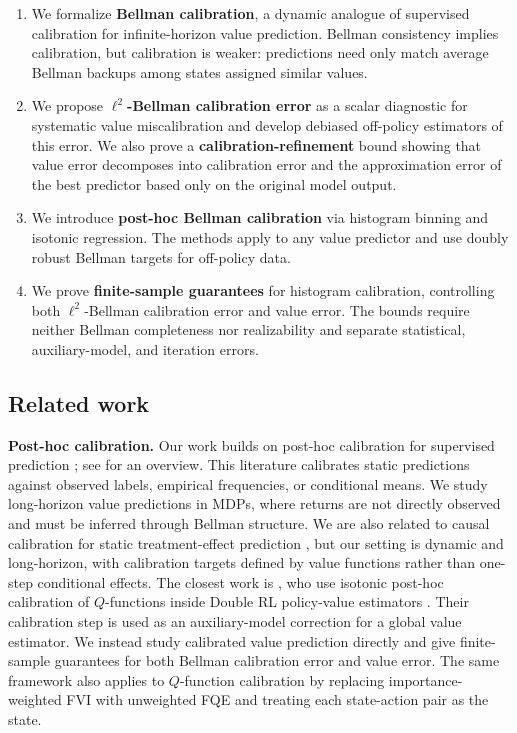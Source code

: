 \documentclass{article}
\theoremstyle{plain}
\theoremstyle{definition}
\theoremstyle{remark}
\begin{document}
\begin{enumerate}[leftmargin=1.5em]
\item We formalize \textbf{Bellman calibration}, a dynamic analogue of
supervised calibration for infinite-horizon value prediction. Bellman consistency
implies calibration, but calibration is weaker: predictions need only match
average Bellman backups among states assigned similar values.

\item We propose \textbf{\(\ell^2\)-Bellman calibration error} as a scalar
diagnostic for systematic value miscalibration and develop debiased off-policy
estimators of this error. We also prove a \textbf{calibration-refinement} bound
showing that value error decomposes into calibration error and the approximation
error of the best predictor based only on the original model output.

\item We introduce \textbf{post-hoc Bellman calibration} via histogram binning
and isotonic regression. The methods apply to any value predictor and use
doubly robust Bellman targets for off-policy data.

\item We prove \textbf{finite-sample guarantees} for histogram calibration,
controlling both \(\ell^2\)-Bellman calibration error and value error. The
bounds require neither Bellman completeness nor realizability and separate
statistical, auxiliary-model, and iteration errors.
\end{enumerate}


\subsection{Related work}

\textbf{Post-hoc calibration.}
Our work builds on post-hoc calibration for supervised prediction
\citep{zadrozny2001obtaining,zadrozny2002transforming,niculescu2005predicting,
bella2010calibration,guo2017calibration}; see \citet{roth2022uncertain} for an
overview. This literature calibrates static predictions against observed labels,
empirical frequencies, or conditional means. We study long-horizon value
predictions in MDPs, where returns are not directly observed and must be inferred
through Bellman structure. We are also related to causal calibration for static
treatment-effect prediction \citep{van2023causal,whitehouse2024orthogonal}, but
our setting is dynamic and long-horizon, with calibration targets defined by
value functions rather than one-step conditional effects. The closest work is \citep{van2025automaticDRL}, who use isotonic post-hoc
calibration of \(Q\)-functions inside Double RL policy-value estimators
\citep{kallus2020double,kallus2022efficiently}. Their calibration step is used
as an auxiliary-model correction for a global value estimator. We instead study calibrated value prediction directly and give finite-sample
guarantees for both Bellman calibration error and value error. The same framework also applies to \(Q\)-function calibration by replacing 
importance-weighted FVI with unweighted FQE and treating each state-action pair
as the state.
 
\end{document}
